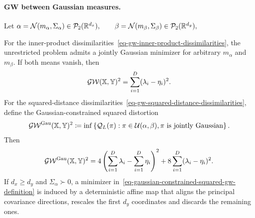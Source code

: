 \paragraph{GW between Gaussian measures.}
Let
\(\alpha=\mathcal{N}(m_\alpha,\Sigma_\alpha)\in\mathcal{P}_2(\mathbb{R}^{d_x}), \qquad \beta=\mathcal{N}(m_\beta,\Sigma_\beta)\in\mathcal{P}_2(\mathbb{R}^{d_y}),\)
\begin{prop}\label{prop-gw-between-gaussians}
For the inner-product dissimilarities~\eqref{eq-gw-inner-product-dissimilarities}, the unrestricted problem admits a jointly Gaussian minimizer for arbitrary $m_\alpha$ and $m_\beta$. If both means vanish, then
\begin{equation}\label{eq-centered-gaussian-inner-product-gw}
\operatorname{\mathcal{GW}}(\mathbb{X},\mathbb{Y})^2
=
\sum_{i=1}^{D}(\lambda_i-\eta_i)^2.
\end{equation}
For the squared-distance dissimilarities~\eqref{eq-gw-squared-distance-dissimilarities}, define the Gaussian-constrained squared distortion
\begin{equation}\label{eq-gaussian-constrained-squared-gw-definition}
\operatorname{\mathcal{GW}}^{\mathrm{Gau}}(\mathbb{X},\mathbb{Y})^2
\coloneqq
\inf\left\{\mathcal Q_L(\pi):
\pi\in\mathcal{U}(\alpha,\beta),
\pi\text{ is jointly Gaussian}\right\}.
\end{equation}
Then
\begin{equation}\label{eq-gaussian-constrained-squared-gw}
\operatorname{\mathcal{GW}}^{\mathrm{Gau}}(\mathbb{X},\mathbb{Y})^2
=
4\left(\sum_{i=1}^{D}\lambda_i-\sum_{i=1}^{D}\eta_i\right)^2
+8\sum_{i=1}^{D}(\lambda_i-\eta_i)^2.
\end{equation}
If $d_x\geq d_y$ and $\Sigma_\alpha\succ0$, a minimizer in~\eqref{eq-gaussian-constrained-squared-gw-definition} is induced by a deterministic affine map that aligns the principal covariance directions, rescales the first $d_y$ coordinates and discards the remaining ones.
\end{prop}
